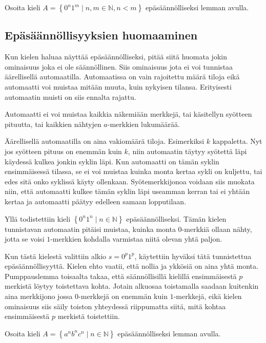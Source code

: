 \documentclass[a4paper,11pt]{article}
\theoremstyle{definition}
\newcommand{\set}[1]{{\left\{ #1 \right\}}}
\newcommand{\Nat}{\mathbb{N}}
\begin{document}
\begin{exercise}
  Osoita kieli $A = \set{0^n1^m \mid n,m \in \Nat, n < m}$
  epä\-sään\-nöl\-li\-sek\-si lemman avulla.
\end{exercise}

\subsection*{Epäsäännöllisyyksien huomaaminen}

Kun kielen haluaa näyttää epäsäännölliseksi, pitää siitä huomata jokin
ominaisuus joka ei ole säännöllinen. Siis ominaisuus jota ei voi tunnistaa
äärellisellä automaatilla. Automaatissa on vain rajoitettu määrä tiloja eikä
automaatti voi muistaa mitään muuta, kuin nykyisen tilansa. Erityisesti
automaatin muisti on siis ennalta rajattu.

Automaatti ei voi muistaa kaikkia näkemiään merkkejä, tai käsitellyn syötteen
pituutta, tai kaikkien nähtyjen $a$-merkkien lukumäärää.

Äärellisellä automaatilla on aina vakiomäärä tiloja. Esimerkiksi $k$
kappaletta. Nyt jos syötteen pituus on enemmän kuin $k$, niin automaatin täytyy
syötettä läpi käydessä kulkea jonkin syklin läpi. Kun automaatti on tämän
syklin ensimmäisessä tilassa, se ei voi muistaa kuinka monta kertaa sykli on
kuljettu, tai edes sitä onko syklissä käyty ollenkaan. Syötemerkkijonoa voidaan
siis muokata niin, että automaatti kulkee tämän syklin läpi useamman kerran tai
ei yhtään kertaa ja automaatti päätyy edelleen samaan lopputilaan.

Yllä todistettiin kieli $\set{0^n1^n \mid n \in \Nat}$ epäsäännölliseksi. Tämän
kielen tunnistavan automaatin pitäisi muistaa, kuinka monta $0$-merkkiä ollaan
nähty, jotta se voisi $1$-merkkien kohdalla varmistaa niitä olevan yhtä paljon.

Kun tästä kielestä valittiin alkio $s = 0^p1^p$, käytettiin hyväksi tätä
tunnistettua epäsäännöllisyyttä. Kielen ehto vaatii, että nollia ja ykkösiä on
aina yhtä monta. Pumppauslemma toisaalta takaa, että säännöllisillä kielillä
ensimmäisestä $p$ merkistä löytyy toistettava kohta. Jotain alkuosaa
toistamalla saadaan kuitenkin aina merkkijono jossa $0$-merkkejä on enemmän
kuin $1$-merkkejä, eikä kielen ominaisuus siis säily toiston yhteydessä
riippumatta siitä, mitä kohtaa ensimmäisestä $p$ merkistä toistettiin.

\begin{exercise}
  Osoita kieli $A = \set{a^nb^nc^n \mid n \in \Nat}$ epäsäännölliseksi
  lemman avulla.
\end{exercise}
\end{document}
